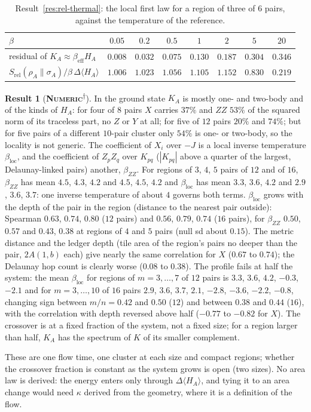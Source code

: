 \documentclass[11pt]{article}
\newcommand{\numeric}{\textbf{\textsc{Numeric}}}
\newcommand{\snap}{\textsuperscript{$\dagger$}}      %
\theoremstyle{definition}
\newtheorem{result}{Result}
\begin{document}
\begin{table}[t]
\centering\footnotesize
\begin{tabular}{@{}lccccccc@{}}
\toprule
$\beta$ & $0.05$ & $0.2$ & $0.5$ & $1$ & $2$ & $5$ & $20$ \\ \midrule
residual of $K_A\approx\beta_{\mathrm{eff}}H_A$ & $0.008$ & $0.032$ & $0.075$ & $0.130$ & $0.187$ & $0.304$ & $0.346$ \\
$S_{\mathrm{rel}}(\rho_A\|\sigma_A)/\beta\,\Delta\langle H_A\rangle$ & $1.006$ & $1.023$ & $1.056$ & $1.105$ & $1.152$ & $0.830$ & $0.219$ \\
\bottomrule
\end{tabular}
\caption{Result~\ref{res:rel-thermal}: the local first law for a region of three of $6$ pairs, against the temperature of the reference.}\label{tab:thermal}
\end{table}
\begin{result}[\numeric\snap]\label{res:rel-profile}
In the ground state $K_A$ is mostly one- and two-body and of the kinds of $H_A$: for four of $8$ pairs $X$ carries $37\%$ and $ZZ$ $53\%$ of the squared norm of its traceless part, no $Z$ or $Y$ at all; for five of $12$ pairs $20\%$ and $74\%$; but for five pairs of a different $10$-pair cluster only $54\%$ is one- or two-body, so the locality is not generic. The coefficient of $X_i$ over $-J$ is a local inverse temperature $\beta_{\mathrm{loc}}$, and the coefficient of $Z_pZ_q$ over $K_{pq}$ ($|K_{pq}|$ above a quarter of the largest, Delaunay-linked pairs) another, $\beta_{ZZ}$. For regions of $3$, $4$, $5$ pairs of $12$ and of $16$, $\beta_{ZZ}$ has mean $4.5$, $4.3$, $4.2$ and $4.5$, $4.5$, $4.2$ and $\beta_{\mathrm{loc}}$ has mean $3.3$, $3.6$, $4.2$ and $2.9$, $3.6$, $3.7$: one inverse temperature of about $4$ governs both terms. $\beta_{\mathrm{loc}}$ grows with the depth of the pair in the region (distance to the nearest pair outside): Spearman $0.63$, $0.74$, $0.80$ ($12$ pairs) and $0.56$, $0.79$, $0.74$ ($16$ pairs), for $\beta_{ZZ}$ $0.50$, $0.57$ and $0.43$, $0.38$ at regions of $4$ and $5$ pairs (null sd about $0.15$). The metric distance and the ledger depth (tile area of the region's pairs no deeper than the pair, $2A(1,b)$ each) give nearly the same correlation for $X$ ($0.67$ to $0.74$); the Delaunay hop count is clearly worse ($0.08$ to $0.38$). The profile fails at half the system: the mean $\beta_{\mathrm{loc}}$ for regions of $m=3,\dots,7$ of $12$ pairs is $3.3$, $3.6$, $4.2$, $-0.3$, $-2.1$ and for $m=3,\dots,10$ of $16$ pairs $2.9$, $3.6$, $3.7$, $2.1$, $-2.8$, $-3.6$, $-2.2$, $-0.8$, changing sign between $m/n=0.42$ and $0.50$ ($12$) and between $0.38$ and $0.44$ ($16$), with the correlation with depth reversed above half ($-0.77$ to $-0.82$ for $X$). The crossover is at a fixed fraction of the system, not a fixed size; for a region larger than half, $K_A$ has the spectrum of $K$ of its smaller complement.
\end{result}
These are one flow time, one cluster at each size and compact regions; whether the crossover fraction is constant as the system grows is open (two sizes). No area law is derived: the energy enters only through $\Delta\langle H_A\rangle$, and tying it to an area change would need $\kappa$ derived from the geometry, where it is a definition of the flow.
\end{document}

